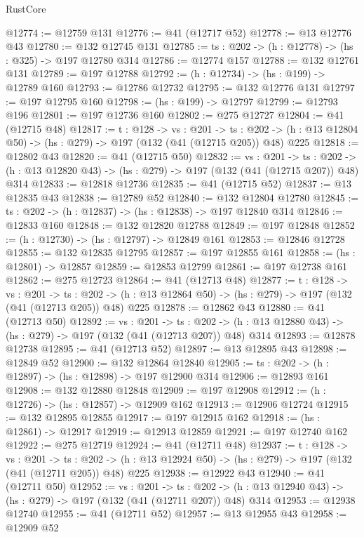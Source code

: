 \begin{lexlean}{RustCore}
\begin{coremodule}
@12774 := @12759 @131
@12776 := @41 (@12717 @52)
@12778 := @13 @12776 @43
@12780 := @132 @12745 @131
@12785 := {ts : @202} -> (h : @12778) -> (hs : @325) -> @197 @12780 @314
@12786 := @12774 @157
@12788 := @132 @12761 @131
@12789 := @197 @12788
@12792 := (h : @12734) -> (hs : @199) -> @12789 @160
@12793 := @12786 @12732
@12795 := @132 @12776 @131
@12797 := @197 @12795 @160
@12798 := (hs : @199) -> @12797
@12799 := @12793 @196
@12801 := @197 @12736 @160
@12802 := @275 @12727
@12804 := @41 (@12715 @48)
@12817 := {t : @128} ->
  {vs : @201} ->
  {ts : @202} -> (h : @13 @12804 @50) -> (hs : @279) -> @197 (@132 (@41 (@12715 @205)) @48) @225
@12818 := @12802 @43
@12820 := @41 (@12715 @50)
@12832 := {vs : @201} ->
  {ts : @202} -> (h : @13 @12820 @43) -> (hs : @279) -> @197 (@132 (@41 (@12715 @207)) @48) @314
@12833 := @12818 @12736
@12835 := @41 (@12715 @52)
@12837 := @13 @12835 @43
@12838 := @12789 @52
@12840 := @132 @12804 @12780
@12845 := {ts : @202} -> (h : @12837) -> (hs : @12838) -> @197 @12840 @314
@12846 := @12833 @160
@12848 := @132 @12820 @12788
@12849 := @197 @12848
@12852 := (h : @12730) -> (hs : @12797) -> @12849 @161
@12853 := @12846 @12728
@12855 := @132 @12835 @12795
@12857 := @197 @12855 @161
@12858 := (hs : @12801) -> @12857
@12859 := @12853 @12799
@12861 := @197 @12738 @161
@12862 := @275 @12723
@12864 := @41 (@12713 @48)
@12877 := {t : @128} ->
  {vs : @201} ->
  {ts : @202} -> (h : @13 @12864 @50) -> (hs : @279) -> @197 (@132 (@41 (@12713 @205)) @48) @225
@12878 := @12862 @43
@12880 := @41 (@12713 @50)
@12892 := {vs : @201} ->
  {ts : @202} -> (h : @13 @12880 @43) -> (hs : @279) -> @197 (@132 (@41 (@12713 @207)) @48) @314
@12893 := @12878 @12738
@12895 := @41 (@12713 @52)
@12897 := @13 @12895 @43
@12898 := @12849 @52
@12900 := @132 @12864 @12840
@12905 := {ts : @202} -> (h : @12897) -> (hs : @12898) -> @197 @12900 @314
@12906 := @12893 @161
@12908 := @132 @12880 @12848
@12909 := @197 @12908
@12912 := (h : @12726) -> (hs : @12857) -> @12909 @162
@12913 := @12906 @12724
@12915 := @132 @12895 @12855
@12917 := @197 @12915 @162
@12918 := (hs : @12861) -> @12917
@12919 := @12913 @12859
@12921 := @197 @12740 @162
@12922 := @275 @12719
@12924 := @41 (@12711 @48)
@12937 := {t : @128} ->
  {vs : @201} ->
  {ts : @202} -> (h : @13 @12924 @50) -> (hs : @279) -> @197 (@132 (@41 (@12711 @205)) @48) @225
@12938 := @12922 @43
@12940 := @41 (@12711 @50)
@12952 := {vs : @201} ->
  {ts : @202} -> (h : @13 @12940 @43) -> (hs : @279) -> @197 (@132 (@41 (@12711 @207)) @48) @314
@12953 := @12938 @12740
@12955 := @41 (@12711 @52)
@12957 := @13 @12955 @43
@12958 := @12909 @52

\end{coremodule}
\end{lexlean}
